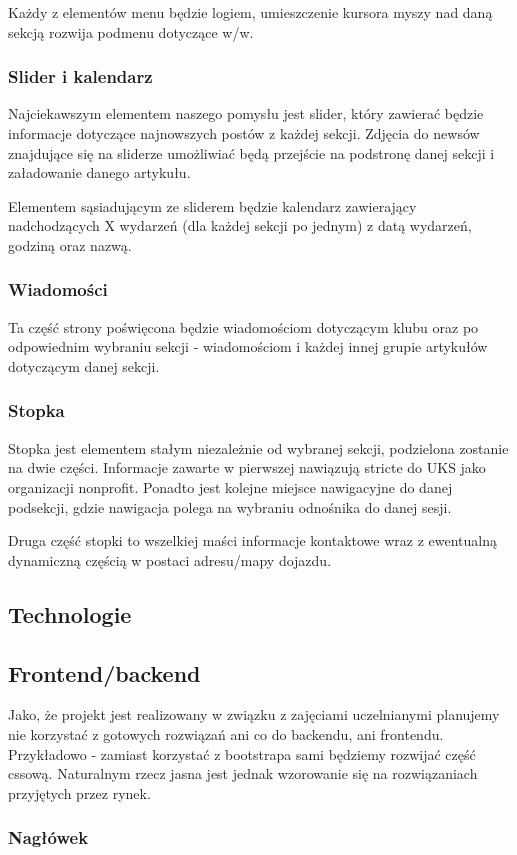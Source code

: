 \documentclass{scrartcl}
\begin{document}
Każdy z elementów menu będzie logiem, umieszczenie kursora myszy nad daną sekcją rozwija podmenu dotyczące w/w.
\subsubsection{Slider i kalendarz} 
Najciekawszym elementem naszego pomysłu jest slider, który zawierać będzie informacje dotyczące najnowszych postów z każdej sekcji. Zdjęcia do newsów znajdujące się na sliderze umożliwiać będą przejście na podstronę danej sekcji i załadowanie danego artykułu.

Elementem sąsiadującym ze sliderem będzie kalendarz zawierający nadchodzących X wydarzeń (dla każdej sekcji po jednym) z datą wydarzeń, godziną oraz nazwą.
\subsubsection{Wiadomości}
Ta część strony poświęcona będzie wiadomościom dotyczącym klubu oraz po odpowiednim wybraniu sekcji - wiadomościom i każdej innej grupie artykułów dotyczącym danej sekcji. 
\subsubsection{Stopka}
Stopka jest elementem stałym niezależnie od wybranej sekcji, podzielona zostanie na dwie części. Informacje zawarte w pierwszej nawiązują stricte do UKS jako organizacji nonprofit. Ponadto jest kolejne miejsce nawigacyjne do danej podsekcji, gdzie nawigacja polega na wybraniu odnośnika do danej sesji.

Druga część stopki to wszelkiej maści informacje kontaktowe wraz z ewentualną dynamiczną częścią w postaci adresu/mapy dojazdu.

\subsection{Technologie}
\subsection{Frontend/backend}
Jako, że projekt jest realizowany w związku z zajęciami uczelnianymi planujemy nie korzystać z gotowych rozwiązań ani co do backendu, ani frontendu. Przykładowo - zamiast korzystać z bootstrapa sami będziemy rozwijać część cssową.  Naturalnym rzecz jasna jest jednak wzorowanie się na rozwiązaniach przyjętych przez rynek.
\subsubsection{Nagłówek}
\end{document}
